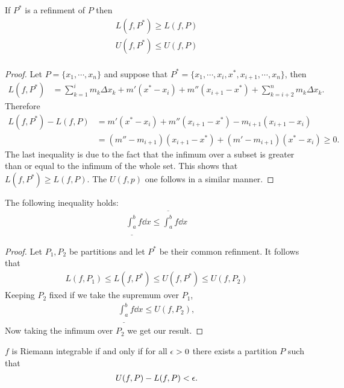 \begin{proposition}
  If $P^*$ is a refinment of $P$ then
  \begin{align*}
    L(f,P^*) \geq L(f,P)\\
    U(f,P^*) \leq U(f,P)\\
  \end{align*}
\end{proposition}
\begin{proof}
  Let $P = \{x_1,\cdots, x_n\}$ and suppose that $P^* = \{x_1, \cdots, x_i, x^*, x_{i+1}, \cdots, x_n\}$, then
  \begin{align*}
    L(f,P^*) &= \sum_{k=1}^i m_k \Delta x_k + m'(x^* - x_{i}) + m''(x_{i+1} - x^*)+\sum_{k=i+2}^n m_k \Delta x_k.
  \end{align*}
  Therefore
  \begin{align*}
    L(f,P^*) -L(f,P) &= m'(x^* - x_{i}) + m''(x_{i+1} - x^*) - m_{i+1}(x_{i+1} - x_i)\\
                     &= (m'' - m_{i+1}) (x_{i+1} - x^*) + (m' - m_{i+1}) (x^* - x_i) \geq 0.
  \end{align*}
  The last inequality is due to the fact that the infimum over a subset is greater than or equal to the infimum of the whole set. This shows that $L(f,P^*) \geq L(f,P)$. The $U(f,p)$ one follows in a similar manner.
\end{proof}
\begin{proposition}
  The following inequality holds:
  \begin{align*}
    \underline{\int_a^b} f \dd x \leq \overline{\int^b_a} f \dd x
  \end{align*}
\end{proposition}
\begin{proof}
  Let $P_1, P_2$ be partitions and let $P^*$ be their common refinment. It follows that
  \begin{align*}
    L(f,P_1) \leq L(f,P^*) \leq U(f,P^*) \leq U(f,P_2)
  \end{align*}
  Keeping $P_2$ fixed if we take the supremum over $P_1$,
  \begin{align*}
    \underline{\int^b_a} f \dd x \leq U(f,P_2),
  \end{align*}
  Now taking the infimum over $P_2$ we get our result.
\end{proof}
\begin{theorem}
  $f$ is Riemann integrable if and only if for all $\epsilon>0$ there exists a partition $P$ such that
  \begin{align*}
    U(f,P) - L(f,P) < \epsilon.
  \end{align*}
\end{theorem}
